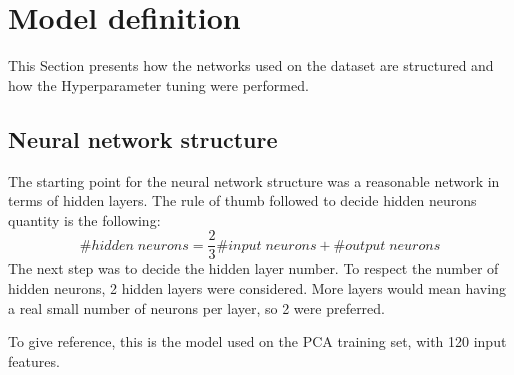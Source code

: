 \section{Model definition}
\label{model-definition}
This Section presents how the networks used on the dataset are 
structured and how the Hyperparameter tuning were performed.

\subsection{Neural network structure}
The starting point for the neural network structure was a 
reasonable network in terms of hidden layers. 
The rule of thumb followed to decide hidden neurons quantity is the 
following: 
$$\#\mathit{hidden\; neurons} = \frac{2}{3}\#\mathit{input\;neurons}
+ \#\mathit{output\;neurons}$$
The next step was to decide the hidden layer number. To respect the number of hidden 
neurons, 2 hidden layers were considered. More layers would mean 
having a real small number of neurons per layer, so 2 were preferred.

To give reference, this is the model used on the PCA training set, with 
120 input features.

